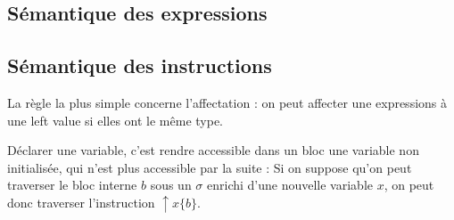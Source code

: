 \subsection{Sémantique des expressions}


\subsection{Sémantique des instructions}

La règle la plus simple concerne l'affectation : on peut affecter une
expressions à une left value si elles ont le même type.

\begin{mathpar}
\end{mathpar}

Déclarer une variable, c'est rendre accessible dans un bloc une variable non
initialisée, qui n'est plus accessible par la suite : Si on suppose qu'on peut
traverser le bloc interne $b$ sous un $σ$ enrichi d'une nouvelle variable $x$,
on peut donc traverser l'instruction $\uparrow x\{b\}$.

\begin{minipage}{0.6\textwidth}
\begin{mathpar}
\end{mathpar}
\end{minipage}
\begin{minipage}{0.4\textwidth}

\end{minipage}

